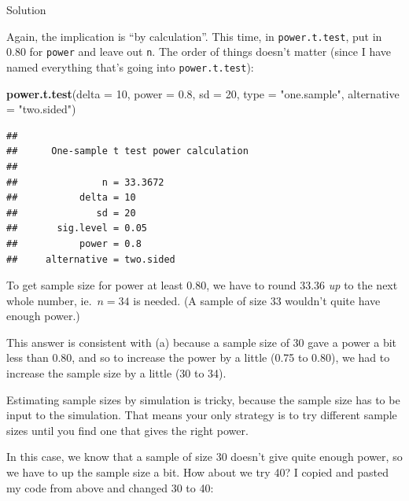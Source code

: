 \documentclass[]{tufte-book}
\newenvironment{Shaded}{}{}
\newcommand{\DataTypeTok}[1]{\textcolor[rgb]{0.56,0.13,0.00}{#1}}
\newcommand{\DecValTok}[1]{\textcolor[rgb]{0.25,0.63,0.44}{#1}}
\newcommand{\FloatTok}[1]{\textcolor[rgb]{0.25,0.63,0.44}{#1}}
\newcommand{\KeywordTok}[1]{\textcolor[rgb]{0.00,0.44,0.13}{\textbf{#1}}}
\newcommand{\NormalTok}[1]{#1}
\newcommand{\OperatorTok}[1]{\textcolor[rgb]{0.40,0.40,0.40}{#1}}
\newcommand{\StringTok}[1]{\textcolor[rgb]{0.25,0.44,0.63}{#1}}
\theoremstyle{definition}
\theoremstyle{definition}
\theoremstyle{definition}
\theoremstyle{remark}
\begin{document}
Solution

Again, the implication is ``by calculation''. This time, in
\texttt{power.t.test}, put in 0.80 for \texttt{power} and leave out
\texttt{n}. The order of things doesn't matter (since I have named
everything that's going into \texttt{power.t.test}):

\begin{Shaded}
\begin{Highlighting}[]
\KeywordTok{power.t.test}\NormalTok{(}\DataTypeTok{delta =} \DecValTok{10}\NormalTok{, }\DataTypeTok{power =} \FloatTok{0.8}\NormalTok{, }\DataTypeTok{sd =} \DecValTok{20}\NormalTok{, }
    \DataTypeTok{type =} \StringTok{"one.sample"}\NormalTok{, }\DataTypeTok{alternative =} \StringTok{"two.sided"}\NormalTok{)}
\end{Highlighting}
\end{Shaded}

\begin{verbatim}
## 
##      One-sample t test power calculation 
## 
##               n = 33.3672
##           delta = 10
##              sd = 20
##       sig.level = 0.05
##           power = 0.8
##     alternative = two.sided
\end{verbatim}

To get sample size for power at least 0.80, we have to round 33.36
\emph{up} to the next whole number, ie.~\(n=34\) is needed. (A sample of
size 33 wouldn't quite have enough power.)

This answer is consistent with (a) because a sample size of 30 gave a
power a bit less than 0.80, and so to increase the power by a little
(0.75 to 0.80), we had to increase the sample size by a little (30 to
34).

Estimating sample sizes by simulation is tricky, because the sample size
has to be input to the simulation. That means your only strategy is to
try different sample sizes until you find one that gives the right
power.

In this case, we know that a sample of size 30 doesn't give quite enough
power, so we have to up the sample size a bit. How about we try 40? I
copied and pasted my code from above and changed 30 to 40:

\begin{Shaded}
\end{Shaded}
\end{document}
